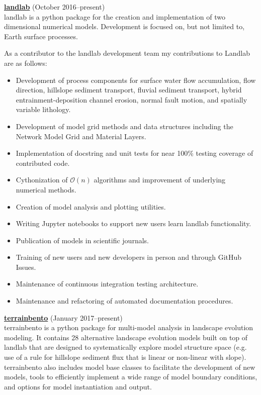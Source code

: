 \documentclass[10pt]{article}
\renewcommand{\section}[1]{\pagebreak[3]%
    \vspace{1.2\baselineskip}%
    \phantomsection\addcontentsline{toc}{section}{#1}%
    \noindent \hspace{-15pt}{\large\scshape #1}%
    \vspace{0.2\baselineskip}\par
}
\begin{document}
\section{Software Packages}
\begin{outerlist}
	\item[]\href{http://landlab.github.io/#/}{\textbf{\ttfamily landlab}} (October 2016--present)\\
	{\ttfamily landlab} is a python package for the creation and implementation of two dimensional numerical models. Development is focused on, but not limited to, Earth surface processes. 
	
	As a contributor to the {\ttfamily landlab} development team my contributions to Landlab are as follows:
	\begin{itemize}[itemsep=0pt]
		\item Development of process components for surface water flow accumulation, flow direction, hillslope sediment transport, fluvial sediment transport, hybrid entrainment-deposition channel erosion, normal fault motion, and spatially variable lithology.
		\item Development of model grid methods and data structures including the Network Model Grid and Material Layers.
		\item Implementation of docstring and unit tests for near 100\% testing coverage of contributed code. 
		\item Cythonization of $\mathcal{O}(n)$ algorithms and improvement of underlying numerical methods. 
		\item Creation of model analysis and plotting utilities.
		\item Writing Jupyter notebooks to support new users learn {\ttfamily landlab} functionality.
		\item Publication of models in scientific journals.
		\item Training of new users and new developers in person and through GitHub Issues.
		\item Maintenance of continuous integration testing architecture.
		\item Maintenance and refactoring of automated documentation procedures.
	\end{itemize}
	
	\item[]\href{https://github.com/TerrainBento/terrainbento}{\textbf{\ttfamily terrainbento}} (January 2017--present)\\
	{\ttfamily terrainbento} is a python package for multi-model analysis in landscape evolution modeling. It contains 28 alternative landscape evolution models built on top of {\ttfamily landlab} that are designed to systematically explore model structure space (e.g. use of a rule for hillslope sediment flux that is linear or non-linear with slope). {\ttfamily terrainbento} also includes model base classes to facilitate the development of new models, tools to efficiently implement a wide range of model boundary conditions, and options for model instantiation and output. 
	

\end{outerlist}
\end{document}
